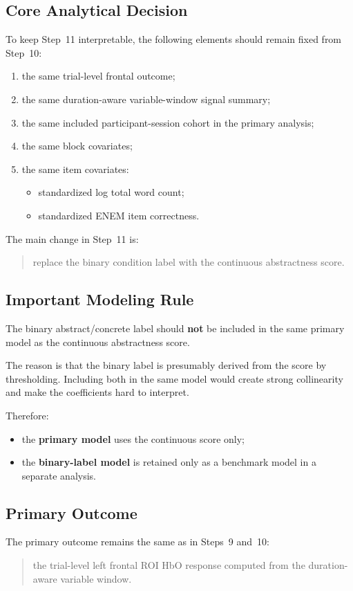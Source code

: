 \subsection{Core Analytical Decision}
To keep Step~11 interpretable, the following elements should remain fixed from Step~10:
\begin{enumerate}
    \item the same trial-level frontal outcome;
    \item the same duration-aware variable-window signal summary;
    \item the same included participant-session cohort in the primary analysis;
    \item the same block covariates;
    \item the same item covariates:
    \begin{itemize}
        \item standardized log total word count;
        \item standardized ENEM item correctness.
    \end{itemize}
\end{enumerate}

The main change in Step~11 is:
\begin{quote}
replace the binary condition label with the continuous abstractness score.
\end{quote}

\subsection{Important Modeling Rule}
The binary abstract/concrete label should \textbf{not} be included in the same primary model
as the continuous abstractness score.

The reason is that the binary label is presumably derived from the score by thresholding.
Including both in the same model would create strong collinearity and make the coefficients hard to interpret.

Therefore:
\begin{itemize}
    \item the \textbf{primary model} uses the continuous score only;
    \item the \textbf{binary-label model} is retained only as a benchmark model in a separate analysis.
\end{itemize}

\subsection{Primary Outcome}
The primary outcome remains the same as in Steps~9 and~10:
\begin{quote}
the trial-level left frontal ROI HbO response computed from the duration-aware variable window.
\end{quote}

